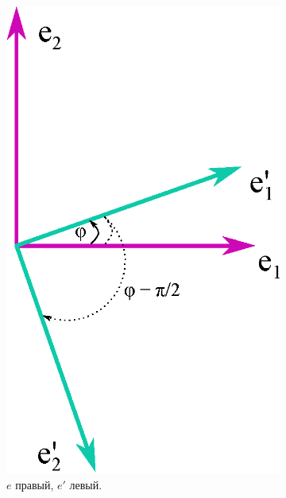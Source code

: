 \documentclass[a4paper,12pt]{article}
\begin{document}
  \begin{figure}
    \centering
    
    \begin{subfigure}[b]{0.3\columnwidth}
      \centering
      \includegraphics[width=\textwidth]{turned-ortonorm-basis2_left2}
      \caption{$e$ правый, $e'$ левый.}
    \end{subfigure}
    \hspace{5em}
    \begin{subfigure}[b]{0.4\columnwidth}
      \centering

\end{subfigure}
\end{figure}
\end{document}
